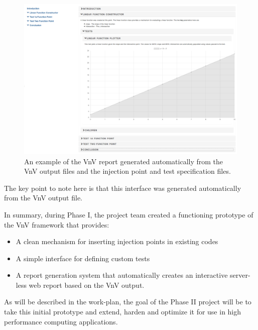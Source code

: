 \begin{figure}
\centering
 \includegraphics[width=\textwidth]{./narrative/figures/render-example.PNG}
\caption{ An example of the VnV report generated automatically from the VnV output files and the injection point and test specification files. \label{rendered-example}}
\end{figure}
 
The key point to note here is that this interface was generated automatically from the VnV output file.

In summary, during Phase I, the project team created a functioning prototype of the VnV framework that provides:
\begin{itemize}
 \item A clean mechanism for inserting injection points in existing codes
 \item A simple interface for defining custom tests 
 \item A report generation system that automatically creates an interactive server-less web report based on the VnV output.
\end{itemize}

As will be described in the work-plan, the goal of the Phase II project will be to take this initial prototype and extend, harden and 
optimize it for use in high performance computing applications. 





























